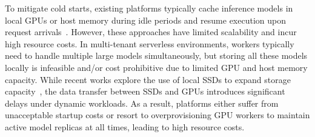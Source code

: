 
To mitigate cold starts, existing platforms typically cache
inference models in local GPUs or host memory during idle periods and resume execution upon request arrivals~\cite{yang_infless_2022,ali_fc, bai_pipeswitch_nodate,faaswap,fu_serverlessllm_2024}. 
However, these approaches have limited scalability and incur high resource costs. In multi-tenant serverless environments, workers typically need to handle multiple large models simultaneously, but storing all these models locally is infeasible and/or cost prohibitive due to limited GPU and host memory capacity. 
While recent works explore the use of local SSDs to expand storage capacity~\cite{fu_serverlessllm_2024}, the data transfer between SSDs and GPUs introduces significant delays under dynamic workloads. As a result, platforms either suffer from unacceptable startup costs or resort to overprovisioning GPU workers to maintain active model replicas at all times, leading to high resource costs. 



